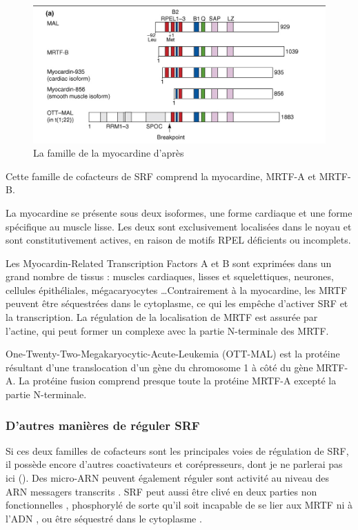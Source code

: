 \begin{figure}[h!]
\includegraphics[scale=0.5]{MRTF_famille.png}
\caption{La famille de la myocardine d'après \cite{posern_actin_2006}}
\end{figure}
Cette famille de cofacteurs de SRF comprend la myocardine, MRTF-A et MRTF-B.

La myocardine se présente sous deux isoformes, une forme cardiaque et une forme spécifique au muscle lisse. Les deux sont exclusivement localisées dans le noyau et sont constitutivement actives, en raison de motifs RPEL déficients ou incomplets. 

Les Myocardin-Related Transcription Factors A et B sont exprimées dans un grand nombre de tissus : muscles cardiaques, lisses et squelettiques, neurones, cellules épithéliales, mégacaryocytes \dots Contrairement à la myocardine, les MRTF peuvent être séquestrées dans le cytoplasme, ce qui les empêche d'activer SRF et la transcription. La régulation de la localisation de MRTF est assurée par l'actine, qui peut former un complexe avec la partie N-terminale des MRTF. 

One-Twenty-Two-Megakaryocytic-Acute-Leukemia (OTT-MAL) est la protéine résultant d'une translocation d'un gène du chromosome 1 à côté du gène MRTF-A. La protéine fusion comprend presque toute la protéine MRTF-A excepté la partie N-terminale. 

\subsubsection{D'autres manières de réguler SRF}

Si ces deux familles de cofacteurs sont les principales voies de régulation de SRF, il possède encore d'autres coactivateurs et corépresseurs, dont je ne parlerai pas ici (\cite{posern_actin_2006}). Des micro-ARN peuvent également réguler sont activité au niveau des ARN messagers transcrits \cite{chen}. 
SRF peut aussi être clivé en deux parties non fonctionnelles  \cite{drewett}, phosphorylé de sorte qu'il soit incapable de se lier aux MRTF ni à l'ADN \cite{Iyer}, ou être séquestré dans le cytoplasme \cite{lange}.   


